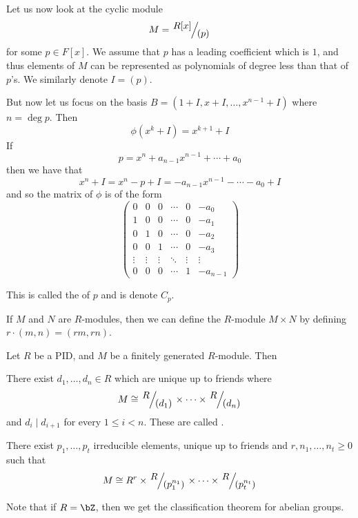 \documentclass[10pt]{article}
\def\divides{{\mid}}
\begin{document}
\begin{exam*}

    Let us now look at the cyclic module
    \[ M = \slfrac{R[x]}{(p)} \]
    for some $p\in F[x]$.
    We assume that $p$ has a leading coefficient which is $1$, and thus elements of $M$ can be represented as polynomials of degree less than that of $p$'s.
    We similarly denote $I=(p)$.

    But now let us focus on the basis $B=(1+I,x+I,\dots,x^{n-1}+I)$ where $n=\deg p$.
    Then
    \[ \phi(x^k + I) = x^{k+1} + I \]
    If
    \[ p = x^n + a_{n-1}x^{n-1} + \cdots + a_0 \]
    then we have that
    \[ x^n + I = x^n - p + I = -a_{n-1}x^{n-1} - \cdots - a_0 + I \]
    and so the matrix of $\phi$ is of the form
    \[ \begin{pmatrix} 
            0 & 0 & 0 & \cdots & 0 & -a_0 \\
            1 & 0 & 0 & \cdots & 0 & -a_1 \\
            0 & 1 & 0 & \cdots & 0 & -a_2 \\
            0 & 0 & 1 & \cdots & 0 & -a_3 \\
            \vdots & \vdots & \vdots & \ddots & \vdots & \vdots \\
            0 & 0 & 0 & \cdots & 1 & -a_{n-1}
    \end{pmatrix} \]

    This is called the  of $p$ and is denote $C_p$.

\end{exam*}

\begin{defn*}

    If $M$ and $N$ are $R$-modules, then we can define the $R$-module $M\times N$ by defining $r\cdot(m,n)=(rm,rn)$.

\end{defn*}

\begin{thrm*}

    Let $R$ be a PID, and $M$ be a finitely generated $R$-module.
    Then
    \benum
        \item There exist $d_1,\dots,d_n\in R$ which are unique up to friends where
        \[ M \cong \slfrac R{(d_1)}\times\cdots\times\slfrac R{(d_n)} \]
        and $d_i\divides d_{i+1}$ for every $1\leq i<n$.
        These are called .

        \item There exist $p_1,\dots,p_t$ irreducible elements, unique up to friends and $r,n_1,\dots,n_t\geq0$ such that
        \[ M\cong R^r\times\slfrac R{(p_1^{n_1})}\times\cdots\times\slfrac R{(p_t^{n_t})} \]
    \eenum

\end{thrm*}

Note that if $R=\bZ$, then we get the classification theorem for abelian groups.
\end{document}
